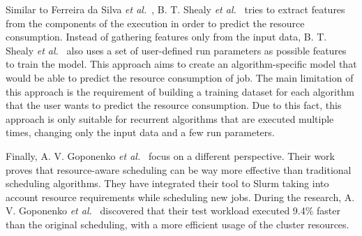 Similar to Ferreira da Silva \emph{et al.}~\cite{ferreira2013}, B. T. Shealy \emph{et al.}~\cite{shealy2021} tries to extract features from the components of the execution in order to predict the resource consumption.
Instead of gathering features only from the input data, B. T. Shealy \emph{et al.}~\cite{shealy2021} also uses a set of user-defined run parameters as possible features to train the model.
This approach aims to create an algorithm-specific model that would be able to predict the resource consumption of job.
The main limitation of this approach is the requirement of building a training dataset for each algorithm that the user wants to predict the resource consumption.
Due to this fact, this approach is only suitable for recurrent algorithms that are executed multiple times, changing only the input data and a few run parameters.

Finally, A. V. Goponenko \emph{et al.}~\cite{goponenko2020} focus on a different perspective.
Their work proves that resource-aware scheduling can be way more effective than traditional scheduling algorithms.
They have integrated their tool to Slurm taking into account resource requirements while scheduling new jobs.
During the research, A. V. Goponenko \emph{et al.}~\cite{goponenko2020} discovered that their test workload executed 9.4\% faster than the original scheduling, with a more efficient usage of the cluster resources.

